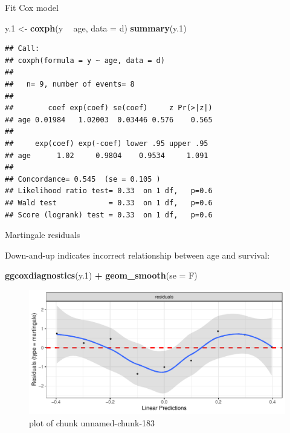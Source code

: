 \documentclass[ignorenonframetext,]{beamer}
\newenvironment{Shaded}{\begin{snugshade}}{\end{snugshade}}
\newcommand{\DataTypeTok}[1]{\textcolor[rgb]{0.13,0.29,0.53}{#1}}
\newcommand{\FloatTok}[1]{\textcolor[rgb]{0.00,0.00,0.81}{#1}}
\newcommand{\KeywordTok}[1]{\textcolor[rgb]{0.13,0.29,0.53}{\textbf{#1}}}
\newcommand{\NormalTok}[1]{#1}
\newcommand{\OperatorTok}[1]{\textcolor[rgb]{0.81,0.36,0.00}{\textbf{#1}}}
\newcommand{\StringTok}[1]{\textcolor[rgb]{0.31,0.60,0.02}{#1}}
\begin{document}
\begin{frame}[fragile]{Fit Cox model}
\protect\hypertarget{fit-cox-model}{}

\footnotesize

\begin{Shaded}
\begin{Highlighting}[]
\NormalTok{y}\FloatTok{.1}\NormalTok{ <-}\StringTok{ }\KeywordTok{coxph}\NormalTok{(y }\OperatorTok{~}\StringTok{ }\NormalTok{age, }\DataTypeTok{data =}\NormalTok{ d)}
\KeywordTok{summary}\NormalTok{(y}\FloatTok{.1}\NormalTok{)}
\end{Highlighting}
\end{Shaded}

\begin{verbatim}
## Call:
## coxph(formula = y ~ age, data = d)
## 
##   n= 9, number of events= 8 
## 
##        coef exp(coef) se(coef)     z Pr(>|z|)
## age 0.01984   1.02003  0.03446 0.576    0.565
## 
##     exp(coef) exp(-coef) lower .95 upper .95
## age      1.02     0.9804    0.9534     1.091
## 
## Concordance= 0.545  (se = 0.105 )
## Likelihood ratio test= 0.33  on 1 df,   p=0.6
## Wald test            = 0.33  on 1 df,   p=0.6
## Score (logrank) test = 0.33  on 1 df,   p=0.6
\end{verbatim}

\normalsize

\end{frame}

\begin{frame}[fragile]{Martingale residuals}
\protect\hypertarget{martingale-residuals}{}

Down-and-up indicates incorrect relationship between age and survival:

\begin{Shaded}
\begin{Highlighting}[]
\KeywordTok{ggcoxdiagnostics}\NormalTok{(y}\FloatTok{.1}\NormalTok{) }\OperatorTok{+}\StringTok{ }\KeywordTok{geom_smooth}\NormalTok{(}\DataTypeTok{se =}\NormalTok{ F)}
\end{Highlighting}
\end{Shaded}

\begin{figure}
\centering
\includegraphics{figure/unnamed-chunk-183-1.pdf}
\caption{plot of chunk unnamed-chunk-183}
\end{figure}

\end{frame}
\end{document}
